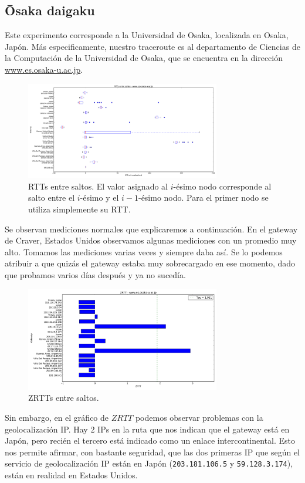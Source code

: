 \subsection{\={O}saka daigaku}

Este experimento corresponde a la Universidad de Osaka, localizada en Osaka, Japón. Más especificamente, nuestro traceroute es al departamento de Ciencias de la Computación de la Universidad de Osaka, que se encuentra en la dirección \url{www.es.osaka-u.ac.jp}.

\begin{figure}[H]
    \centering
    \includegraphics[width=8.5cm]{img/grafico1-www-es-osaka-u-ac-jp.pdf}
    \caption{\normalfont RTTs entre saltos. El valor asignado al $i$-ésimo nodo corresponde al salto entre el $i$-ésimo y el $i - 1$-ésimo nodo. Para el primer nodo se utiliza simplemente su RTT.}
\end{figure}

Se observan mediciones normales que explicaremos a continuación. En el gateway de Craver, Estados Unidos observamos algunas mediciones con un promedio muy alto. Tomamos las mediciones varias veces y siempre daba así. Se lo podemos atribuir a que quizás el gateway estaba muy sobrecargado en ese momento, dado que probamos varios días después y ya no sucedía.

\begin{figure}[H]
    \centering
    \includegraphics[width=8.5cm]{img/grafico2-www-es-osaka-u-ac-jp.pdf}
    \caption{\normalfont ZRTTs entre saltos.}
\end{figure}

Sin embargo, en el gráfico de $ZRTT$ podemos observar problemas con la geolocalización IP. Hay 2 IPs en la ruta que nos indican que el gateway está en Japón, pero recién el tercero está indicado como un enlace intercontinental.
Esto nos permite afirmar, con bastante seguridad, que las dos primeras IP que según el servicio de geolocalización IP están en Japón (\texttt{203.181.106.5} y \texttt{59.128.3.174}), están en realidad en Estados Unidos.

